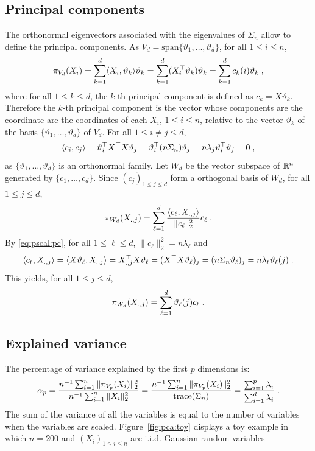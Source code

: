 \subsection{Principal components}
The orthonormal eigenvectors associated with the eigenvalues of $\Sigma_n$ allow to define the principal components. As $V_d = \mathrm{span}\{\vartheta_1, \ldots, \vartheta_d\}$, for all $1\leqslant i\leqslant n$,
\[
\pi_{V_d}(X_i) = \sum_{k=1}^d \langle X_i,\vartheta_k\rangle \vartheta_k  = \sum_{k=1}^d (X^\top_i \vartheta_k)\vartheta_k = \sum_{k=1}^d c_k(i)\vartheta_k\;,
\]
where for all $1\leqslant k \leqslant d$, the $k$-th principal component is defined as $c_k = X\vartheta_k$. Therefore the $k$-th principal component is the vector whose components are the coordinate are the coordinates of each $X_i$, $1\leqslant i\leqslant n$, relative to the vector $\vartheta_k$ of the basis $\{\vartheta_1, \ldots, \vartheta_d\}$ of $V_d$. For all $1\leqslant i\neq j \leqslant d$,
\begin{equation}
\label{eq:pscal:pc}
\langle c_i,c_j\rangle = \vartheta^\top_i X^\top X \vartheta_j = \vartheta^\top_i(n\Sigma_n)\vartheta_j = n \lambda_j \vartheta^\top_i\vartheta_j = 0\;, 
\end{equation}
as $\{\vartheta_1, \ldots, \vartheta_d\}$ is an orthonormal family. Let $W_d$ be the vector subspace of $\mathbb{R}^n$ generated by $\{c_1,\ldots,c_d\}$. Since $(c_j)_{1 \leqslant j\leqslant d}$ form a orthogonal basis of $W_d$, for all $1\leqslant j\leqslant d$, 
\[
\pi_{W_d}(X_{.,j}) = \sum_{\ell=1}^d \frac{\langle c_{\ell}, X_{.,j}\rangle }{\|c_{\ell}\|_2^2 }c_{\ell}\;.
\]
By \eqref{eq:pscal:pc},  for all $1\leqslant \ell\leqslant d$, $\|c_{\ell}\|_2^2 = n \lambda_{\ell}$ and 
\[
\langle c_{\ell}, X_{.,j} \rangle  = \langle X \vartheta_{\ell} , X_{.,j} \rangle  = X^\top_{.,j}X\vartheta_{\ell} = (X^\top X\vartheta_{\ell})_j = (n \Sigma_n \vartheta_{\ell})_j = n \lambda_{\ell} \vartheta_{\ell}(j)\;.
\]
This yields, for all $1\leqslant j\leqslant d$, 
\[
\pi_{W_d}(X_{.,j}) = \sum_{\ell=1}^d \vartheta_{\ell}(j)c_{\ell}\;.
\]

\subsection{Explained variance}
The percentage of variance explained by the first $p$ dimensions is: 
\[ 
\alpha_p = \frac{n^{-1}\sum_{i=1}^n\|\pi_{V_p}(X_{i})\|_2^2}{n^{-1}\sum_{i=1}^n\|X_{i}\|_2^2} = \frac{n^{-1} \sum_{i=1}^n\|\pi_{V_p}(X_{i})\|_2^2}{\mathrm{trace}(\Sigma_n)} = \frac{\sum_{i=1}^p\lambda_i}{\sum_{i=1}^d\lambda_i}\;.
\]
The sum of the variance of all the variables is equal to the number of variables when the variables are scaled. Figure~\ref{fig:pca:toy} displays a toy example in which $n =200$ and $(X_i)_{1\leq i \leq n}$ are i.i.d. Gaussian random variables

